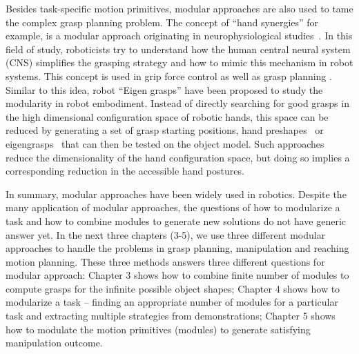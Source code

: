 Besides task-specific motion primitives, modular approaches are also used to tame the complex grasp planning problem. The concept of ``hand synergies'' for example, is a modular approach originating in neurophysiological studies~\citep{santello1998postural,santello2000force}. In this field of study, roboticists try to understand how the human central neural system (CNS) simplifies the grasping strategy and how to mimic this mechanism in robot systems. This concept is used in grip force control \citep{gabiccini2011role} as well as grasp planning \citep{gioioso2013mapping}. Similar to this idea, robot ``Eigen grasps'' have been proposed to study the modularity in robot embodiment. Instead of directly searching for good grasps in the high dimensional configuration space of robotic hands, this space can be reduced by generating a set of grasp starting positions, hand preshapes~\cite{miller2003automatic} or eigengrasps~\cite{Ciocarlie2009} that can then be tested on the object model. Such approaches reduce the dimensionality of the hand configuration space, but doing so implies a corresponding reduction in the accessible hand postures.

In summary, modular approaches have been widely used in robotics. Despite the many application of modular approaches, the questions of how to modularize a task and how to combine modules to generate new solutions do not have generic answer yet. In the next three chapters (3-5), we use three different modular approaches to handle the problems in grasp planning, manipulation and reaching motion planning. These three methods answers three different questions for modular approach: Chapter 3 shows how to combine finite number of modules to compute grasps for the infinite possible object shapes; Chapter 4 shows how to modularize a task -- finding an appropriate number of modules for a particular task and extracting multiple strategies from demonstrations; Chapter 5 shows how to modulate the motion primitives (modules) to generate satisfying manipulation outcome. 


